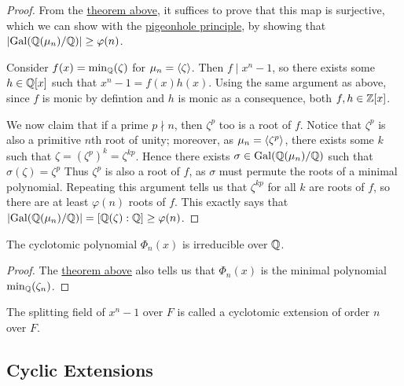 \begin{proof}
    From the \hyperref[thm:cyclotomic-injective]{theorem above},
    it suffices to prove that this map is surjective,
    which we can show with the \hyperref[thm:pigeonhole]{pigeonhole principle},
    by showing that \(\abs{\operatorname{Gal}(\mathbb{Q}(\mu_n)/\mathbb{Q})} \geq \varphi(n)\).

    Consider \(f(x) = \min_{\mathbb{Q}}(\zeta)\) for \(\mu_n = \left\langle\zeta\right\rangle\).
    Then \(f \mid x^n - 1\), so there exists some \(h \in \mathbb{Q}[x]\) such that \(x^n - 1 = f(x)h(x)\).
    Using the same argument as above,
    since \(f\) is monic by defintion and \(h\) is monic as a consequence,
    both \(f,h \in \mathbb{Z}[x]\).

    We now claim that if a prime \(p \nmid n\), then \(\zeta^p\) too is a root of \(f\).
    Notice that \(\zeta^p\) is also a primitive \(n\)th root of unity;
    moreover, as \(\mu_n = \left\langle\zeta^p\right\rangle\),
    there exists some \(k\) such that \(\zeta = {(\zeta^p)}^k = \zeta^{kp}\).
    Hence there exists \(\sigma \in \operatorname{Gal}(\mathbb{Q}(\mu_n)/\mathbb{Q})\) such that \(\sigma(\zeta) = \zeta^p\)
    Thus \(\zeta^p\) is also a root of \(f\), as \(\sigma\) must permute the roots of a minimal polynomial.
    Repeating this argument tells us that \(\zeta^{kp}\) for all \(k\) are roots of \(f\),
    so there are at least \(\varphi(n)\) roots of \(f\).
    This exactly says that \(\abs{\operatorname{Gal}(\mathbb{Q}(\mu_n)/\mathbb{Q})} = [\mathbb{Q}(\zeta):\mathbb{Q}] \geq \varphi(n)\).
\end{proof}
\begin{corollary}
    The cyclotomic polynomial \(\Phi_n(x)\) is irreducible over \(\mathbb{Q}\).
\end{corollary}
\begin{proof}
    The \hyperref[thm:cyclotomic-isomorphism]{theorem above} also tells us that
    \(\Phi_n(x)\) is the minimal polynomial \(\min_{\mathbb{Q}}(\zeta_n)\).
\end{proof}

\begin{definition}
    The splitting field of \(x^n - 1\) over \(F\)
    is called a cyclotomic extension of order \(n\) over \(F\).
\end{definition}


\subsection*{Cyclic Extensions}

